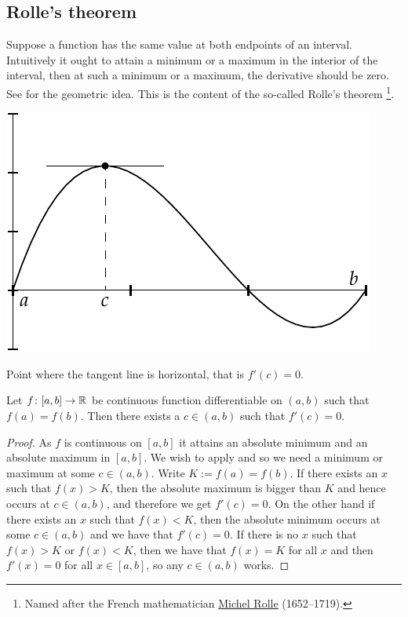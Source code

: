 \subsection{Rolle's theorem}

Suppose a function has the same value at both endpoints of an interval.
Intuitively it ought to attain a minimum or a maximum in the interior of the
interval,
then at such a minimum or a maximum, the derivative should be zero.
See  for the geometric idea.  This is the content of the
so-called Rolle's theorem%
\footnote{Named after the French mathematician
\href{https://en.wikipedia.org/wiki/Michel_Rolle}{Michel Rolle}
(1652--1719).}.

\begin{myfigureht}
\includegraphics{figures/rollefig}
\caption{Point where the tangent line is horizontal, that is $f'(c) =
0$.\label{rollefig}}
\end{myfigureht}

\begin{thm}[Rolle] \label{thm:rolle}
Let $f \colon [a,b] \to {\mathbb{R}}$ be continuous function
differentiable on $(a,b)$ such that $f(a) = f(b)$.
Then there exists a $c \in (a,b)$ such that $f'(c) = 0$.
\end{thm}

\begin{proof}
As $f$ is continuous on $[a,b]$ it attains an absolute minimum and an
absolute 
maximum in $[a,b]$.  We wish to apply  and
so we need a minimum or maximum at some $c \in (a,b)$.
Write $K := f(a) = f(b)$.
If there exists an $x$ such that $f(x) > K$, then the absolute
maximum is bigger than $K$ and hence occurs at $c \in (a,b)$, and
therefore we get $f'(c) = 0$.  On the other hand if there exists an $x$
such that $f(x) < K$, then the absolute minimum occurs at some
$c \in (a,b)$ and we have that $f'(c) = 0$.  If there is no $x$ such that
$f(x) > K$ or
$f(x) < K$, then we have that $f(x) = K$ for all $x$ and then
$f'(x) = 0$ for all $x \in [a,b]$, so any $c \in (a,b)$ works.
\end{proof}

